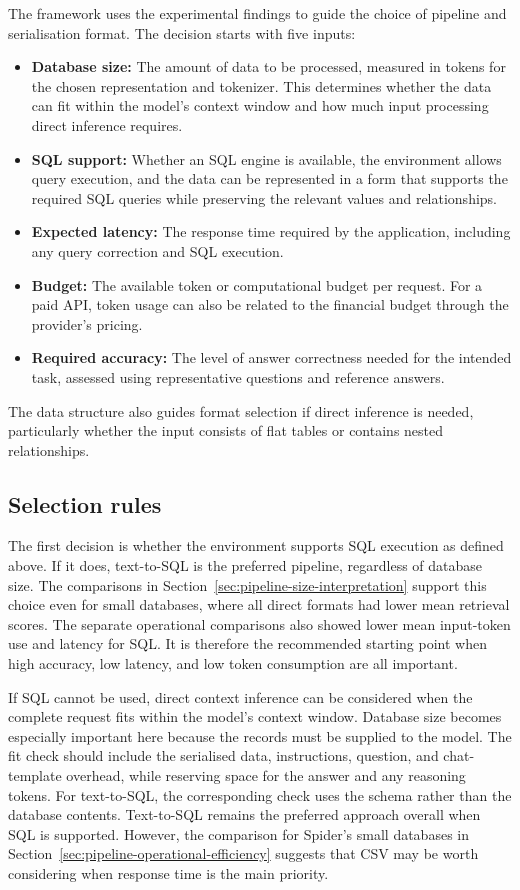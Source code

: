 The framework uses the experimental findings to guide the choice of pipeline and serialisation format. The
decision starts with five inputs:

\begin{itemize}
  \item \textbf{Database size:} The amount of data to be processed, measured in tokens for the chosen
    representation and tokenizer. This determines whether the data can fit within the model's context window
    and how much input processing direct inference requires.
  \item \textbf{SQL support:} Whether an SQL engine is available, the environment allows query execution, and
    the data can be represented in a form that supports the required SQL queries while preserving the
    relevant values and relationships.
  \item \textbf{Expected latency:} The response time required by the application, including any query
    correction and SQL execution.
  \item \textbf{Budget:} The available token or computational budget per request. For a paid API, token usage
    can also be related to the financial budget through the provider's pricing.
  \item \textbf{Required accuracy:} The level of answer correctness needed for the intended task, assessed
    using representative questions and reference answers.
\end{itemize}

The data structure also guides format selection if direct inference is needed, particularly whether the input
consists of flat tables or contains nested relationships.

\subsection{Selection rules}

The first decision is whether the environment supports SQL execution as defined above. If it does,
text-to-SQL is the preferred pipeline, regardless of database size. The comparisons in
Section~\ref{sec:pipeline-size-interpretation} support this choice even for small databases, where all direct
formats had lower mean retrieval scores. The separate operational comparisons also showed lower mean
input-token use and latency for SQL. It is therefore the recommended starting point when high accuracy, low
latency, and low token consumption are all important.

If SQL cannot be used, direct context inference can be considered when the complete request fits within the
model's context window. Database size becomes especially important here because the records must be supplied
to the model. The fit check should include the serialised data, instructions, question, and chat-template
overhead, while reserving space for the answer and any reasoning tokens. For text-to-SQL, the corresponding
check uses the schema rather than the database contents. Text-to-SQL remains the preferred approach overall
when SQL is supported. However, the comparison for Spider’s small databases in
Section~\ref{sec:pipeline-operational-efficiency} suggests that CSV may be worth considering when response
time is the main priority.

